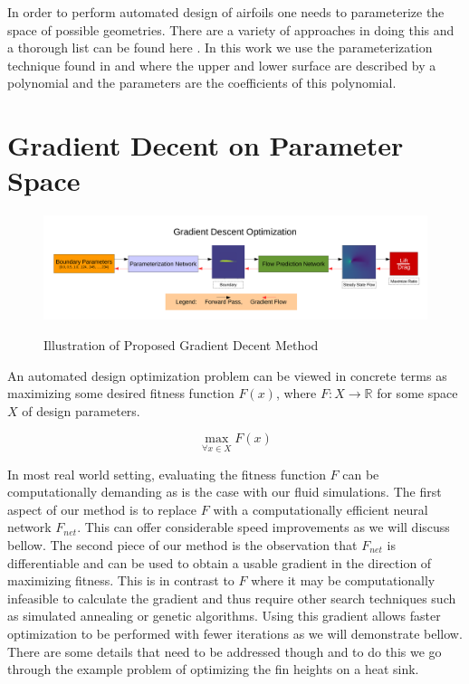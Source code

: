 \documentclass{article} %
\begin{document}
In order to perform automated design of airfoils one needs to parameterize the space of possible geometries. There are a variety of approaches in doing this and a thorough list can be found here \cite{salunke2014airfoil}. In this work we use the parameterization technique found in \cite{lane2009surface} and \cite{hilton2007universal} where the upper and lower surface are described by a polynomial and the parameters are the coefficients of this polynomial.

\section{Gradient Decent on Parameter Space}

\begin{figure}[h]
\begin{center}
\includegraphics[scale=0.34]{./gradient_descent_optimization.pdf}
\label{gradient_descent_optimization}
\end{center}
\caption{Illustration of Proposed Gradient Decent Method}
\end{figure}


An automated design optimization problem can be viewed in concrete terms as maximizing some desired fitness function $F(x)$, where $F:X \rightarrow \mathbb{R}$ for some space $X$ of design parameters.

\begin{equation}
  \max_{\forall x \in X} F(x)
\end{equation}

In most real world setting, evaluating the fitness function $F$ can be computationally demanding as is the case with our fluid simulations. The first aspect of our method is to replace $F$ with a computationally efficient neural network $F_{net}$. This can offer considerable speed improvements as we will discuss bellow. The second piece of our method is the observation that $F_{net}$ is differentiable and can be used to obtain a usable gradient in the direction of maximizing fitness. This is in contrast to $F$ where it may be computationally infeasible to calculate the gradient and thus require other search techniques such as simulated annealing or genetic algorithms. Using this gradient allows faster optimization to be performed with fewer iterations as we will demonstrate bellow. There are some details that need to be addressed though and to do this we go through the example problem of optimizing the fin heights on a heat sink.
\end{document}
